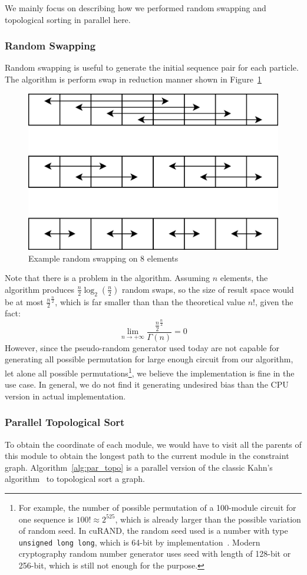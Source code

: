 \documentclass{article}
\begin{document}
We mainly focus on describing how we performed random swapping and topological sorting in parallel here.
\subsubsection{Random Swapping}
\label{sec:orgecc4c08}
Random swapping is useful to generate the initial sequence pair for each particle. The algorithm is perform swap in reduction manner shown in Figure~\ref{fig:swap}

\begin{figure}[htb]
\centering
\includegraphics[width=0.5\linewidth]{Swap.PNG}
\caption{Example random swapping on 8 elements}
\label{fig:swap}
\end{figure}

Note that there is a problem in the algorithm. Assuming $n$ elements, the algorithm produces $\frac{n}{2}\log_2(\frac{n}{2})$ random swaps, so the size of result space would be at most $\frac{n}{2}^\frac{n}{2}$, which is far smaller than than the theoretical value $n!$, given the fact:
$$\lim_{n\to+\infty}\frac{\frac{n}{2}^\frac{n}{2}}{\Gamma(n)}=0$$
However, since the pseudo-random generator used today are not capable for generating all possible permutation for large enough circuit from our algorithm, let alone all possible permutations\footnote{For example, the number of possible permutation of a 100-module circuit for one sequence is $100!\approx2^{525}$, which is already larger than the possible variation of random seed. In cuRAND, the random seed used is a number with type \texttt{unsigned long long}, which is 64-bit by implementation~\cite{cuda}. Modern cryptography random number generator uses seed with length of 128-bit or 256-bit, which is still not enough for the purpose.}, we believe the implementation is fine in the use case. 
In general, we do not find it generating undesired bias than the CPU version in actual implementation.

\subsubsection{Parallel Topological Sort}
\label{sec:org9afab51}
To obtain the coordinate of each module, we would have to visit all the parents of this module to obtain the longest path to the current module in the constraint graph. Algorithm~\ref{alg:par_topo} is a parallel version of the classic Kahn's algorithm~\cite{KAHN10.1145/368996.369025} to topological sort a graph.
\end{document}
